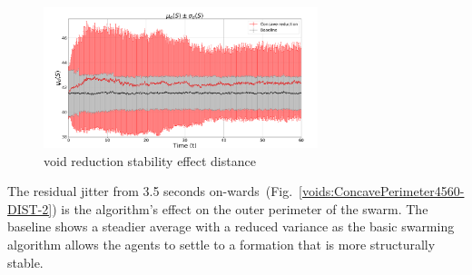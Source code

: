 \documentclass[preprint,12pt]{elsarticle}
\begin{document}
\begin{figure}
\begin{center}
\includegraphics[width=8cm]{figures/ConcavePerimeter4560-DIST}
\end{center}
\caption{void reduction stability effect distance\label{voids:ConcavePerimeter4560-DIST}}
\end{figure}

The residual jitter from 3.5 seconds on-wards~(Fig.~\ref{voids:ConcavePerimeter4560-DIST-2}) is the algorithm's effect on the outer perimeter of the swarm. The baseline shows a steadier average with a reduced variance as the basic swarming algorithm allows the agents to settle to a formation that is more structurally stable.
\end{document}
